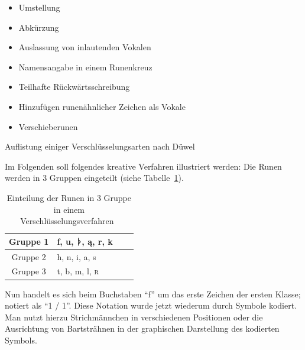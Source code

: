 \documentclass[a4paper]{scrartcl}
\begin{document}
\begin{table}[p]
  \begin{minipage}{0.5\textwidth}
    \begin{itemize}
      \item Umstellung
      \item Abkürzung
      \item Auslassung von inlautenden Vokalen
      \item Namensangabe in einem Runenkreuz
    \end{itemize}
  \end{minipage}
  \begin{minipage}{0.5\textwidth}
    \begin{itemize}
      \item Teilhafte Rückwärtsschreibung
      \item Hinzufügen runenähnlicher Zeichen als Vokale
      \item Verschieberunen
    \end{itemize}
  \end{minipage}
  \caption{Auflistung einiger Verschlüsselungsarten nach Düwel~\cite[S. 182]{düwel}}
  \label{tab:encodings}
\end{table}

Im Folgenden soll folgendes kreative Verfahren illustriert werden: Die Runen werden in 3 Gruppen eingeteilt (siehe Tabelle~\ref{tab:encode}).

\begin{table}[p]
  \begin{center}
    \begin{tabular}{clll}
     \hline \hline
      Gruppe 1 & f, u, {\runicfont ᚦ}, {\runicfont ą}, r, k \\
     \hline
      Gruppe 2 & h, n, i, a, s \\
     \hline
      Gruppe 3 & t, b, m, l, \textsc{r} \\
     \hline \hline
    \end{tabular}
    \caption{Einteilung der Runen in 3 Gruppe in einem Verschlüsselungsverfahren~\cite[S. 183]{düwel}}
    \label{tab:encode}
  \end{center}
\end{table}

Nun handelt es sich beim Buchstaben \enquote{f} um das erste Zeichen der ersten Klasse; notiert als \enquote{1 / 1}. Diese Notation wurde jetzt wiederum durch Symbole kodiert. Man nutzt hierzu Strichmännchen in verschiedenen Positionen oder die Ausrichtung von Bartsträhnen in der graphischen Darstellung des kodierten Symbols.
\end{document}

